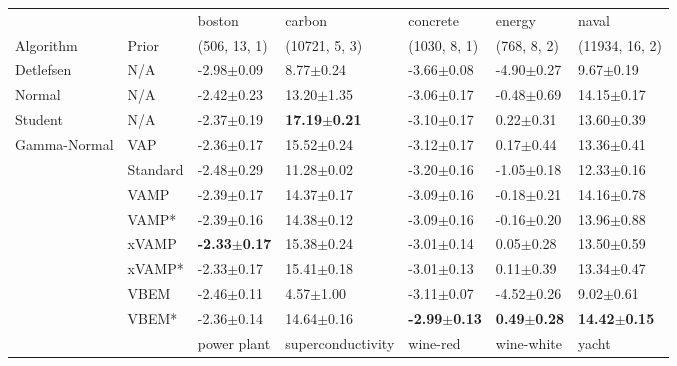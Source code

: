 \begin{tabular}{lllllll}
\toprule
             &       &                   boston &                   carbon &                 concrete &                  energy &                    naval \\
Algorithm & Prior& (506, 13, 1)& (10721, 5, 3)& (1030, 8, 1)& (768, 8, 2)& (11934, 16, 2)\\
\midrule
Detlefsen & N/A &           -2.98$\pm$0.09 &            8.77$\pm$0.24 &           -3.66$\pm$0.08 &          -4.90$\pm$0.27 &            9.67$\pm$0.19 \\
Normal & N/A &           -2.42$\pm$0.23 &           13.20$\pm$1.35 &           -3.06$\pm$0.17 &          -0.48$\pm$0.69 &           14.15$\pm$0.17 \\
Student & N/A &           -2.37$\pm$0.19 &  \textbf{17.19$\pm$0.21} &           -3.10$\pm$0.17 &           0.22$\pm$0.31 &           13.60$\pm$0.39 \\
Gamma-Normal & VAP &           -2.36$\pm$0.17 &           15.52$\pm$0.24 &           -3.12$\pm$0.17 &           0.17$\pm$0.44 &           13.36$\pm$0.41 \\
             & Standard &           -2.48$\pm$0.29 &           11.28$\pm$0.02 &           -3.20$\pm$0.16 &          -1.05$\pm$0.18 &           12.33$\pm$0.16 \\
             & VAMP &           -2.39$\pm$0.17 &           14.37$\pm$0.17 &           -3.09$\pm$0.16 &          -0.18$\pm$0.21 &           14.16$\pm$0.78 \\
             & VAMP* &           -2.39$\pm$0.16 &           14.38$\pm$0.12 &           -3.09$\pm$0.16 &          -0.16$\pm$0.20 &           13.96$\pm$0.88 \\
             & xVAMP &  \textbf{-2.33$\pm$0.17} &           15.38$\pm$0.24 &           -3.01$\pm$0.14 &           0.05$\pm$0.28 &           13.50$\pm$0.59 \\
             & xVAMP* &           -2.33$\pm$0.17 &           15.41$\pm$0.18 &           -3.01$\pm$0.13 &           0.11$\pm$0.39 &           13.34$\pm$0.47 \\
             & VBEM &           -2.46$\pm$0.11 &            4.57$\pm$1.00 &           -3.11$\pm$0.07 &          -4.52$\pm$0.26 &            9.02$\pm$0.61 \\
             & VBEM* &           -2.36$\pm$0.14 &           14.64$\pm$0.16 &  \textbf{-2.99$\pm$0.13} &  \textbf{0.49$\pm$0.28} &  \textbf{14.42$\pm$0.15} \\
\midrule
             &       &              power plant &        superconductivity &                 wine-red &               wine-white &                    yacht \\

\end{tabular}

